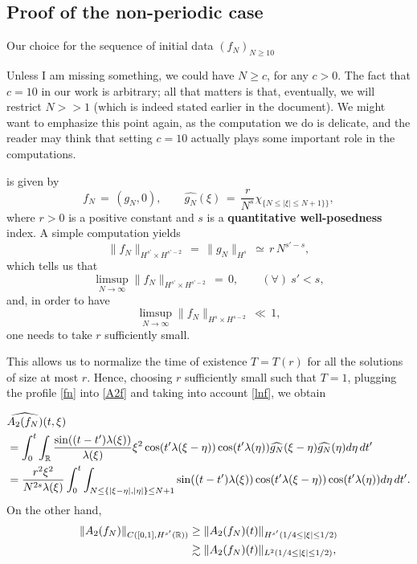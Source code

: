 \documentclass{amsart}
\begin{document}
\subsection{Proof of the non-periodic case} Our choice for the sequence of initial data $(f_N)_{N\geq 10}$ 
\begin{framed}
  Unless I am missing something, we could have $N \ge c$, for any $c>0$. The fact that $c=10$ in our work is arbitrary; all that matters is that, eventually, we will restrict $N >>1$ (which is indeed stated earlier in the document). We might want to emphasize this point again, as the computation we do is delicate, and the reader may think that setting $c=10$ actually plays some important role in the computations. 
\end{framed}
is given by
\begin{equation}
f_N\,=\,(g_N, 0), \qquad \widehat{g_N}(\xi)\,=\,\frac{r}{N^s} \chi_{\{N \leq |\xi| \leq N + 1\}\}},
\label{fn}
\end{equation}
where $r>0$ is a positive constant and $s$ is a \textbf{quantitative well-posedness} index. A simple computation yields
\begin{equation}
\|f_N\|_{H^{s'}\times H^{s'-2}}\,=\,\|g_N\|_{H^s}\,\simeq\,r\,N^{s'-s},
\label{hsfn}
\end{equation}
which tells us that
\[
\limsup_{N\to \infty} \|f_N\|_{H^{s'} \times H^{s' -2}}\,=\,0, \qquad (\forall)\ s'<s, 
\]
and, in order to have 
\[
\limsup_{N\to \infty} \|f_N\|_{H^s \times H^{s -2}}\,\ll\,1,
\]
one needs to take $r$ sufficiently small. 
\begin{framed}
This allows us to normalize the time of existence $T = T(r)$ for all the solutions of size at most $r$. Hence, choosing $r$ sufficiently small such that $T=1$, plugging 
the profile \eqref{fn} into \eqref{A2f} and taking into account \eqref{lnf}, we obtain
\end{framed}
\begin{equation}
\aligned
&\widehat{A_2(f_N)}(t,\xi)\\
&=\int_0^t \int_{\mathbb{R}} \frac{\sin((t-t') \lambda(\xi))}{\lambda(\xi)} \xi^2 \cos(t' \lambda(\xi-\eta))\cos(t'\lambda(\eta))\widehat{g_N}(\xi-\eta)\widehat{g_N}(\eta)d\eta\,dt'\\
&=\frac{r^2 \xi^2}{N^{2s}\lambda(\xi)}\int_0^t \int_{N \leq \{|\xi-\eta|, |\eta| \}\leq N+1}\sin((t-t') \lambda(\xi))\cos(t' \lambda(\xi-\eta))\cos(t'\lambda(\eta))d\eta\,dt'.\endaligned
\label{A2fn}
\end{equation}
On the other hand,
\begin{equation}
\aligned
\|A_2(f_N)\|_{C([0,1], H^{s'}(\mathbb{R}))} &\geq \|A_2(f_N)(t)\|_{H^{s'}(1/4\leq |\xi| \leq 1/2)}\\ &\gtrsim \|A_2(f_N)(t)\|_{L^2(1/4\leq |\xi| \leq 1/2)},\label{hsA2}
\endaligned
\end{equation}
\end{document}
